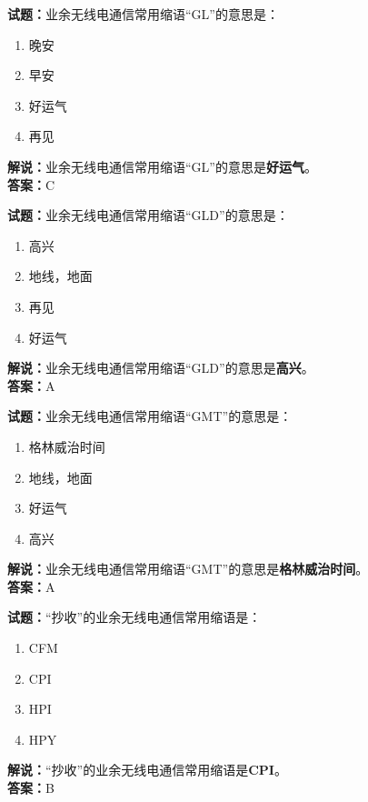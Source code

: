 \documentclass{ctexbook}
\begin{document}
\bigskip


\noindent\textbf{试题：}业余无线电通信常用缩语“GL”的意思是：
\begin{enumerate}[leftmargin=3em]
\item 晚安
\item 早安
\item 好运气
\item 再见
\end{enumerate}
\noindent\textbf{解说：}业余无线电通信常用缩语“GL”的意思是\textbf{好运气}。\\\noindent\textbf{答案：}C



\bigskip


\noindent\textbf{试题：}业余无线电通信常用缩语“GLD”的意思是：
\begin{enumerate}[leftmargin=3em]
\item 高兴
\item 地线，地面
\item 再见
\item 好运气
\end{enumerate}
\noindent\textbf{解说：}业余无线电通信常用缩语“GLD”的意思是\textbf{高兴}。\\\noindent\textbf{答案：}A



\bigskip


\noindent\textbf{试题：}业余无线电通信常用缩语“GMT”的意思是：
\begin{enumerate}[leftmargin=3em]
\item 格林威治时间
\item 地线，地面
\item 好运气
\item 高兴
\end{enumerate}
\noindent\textbf{解说：}业余无线电通信常用缩语“GMT”的意思是\textbf{格林威治时间}。\\\noindent\textbf{答案：}A



\bigskip


\noindent\textbf{试题：}“抄收”的业余无线电通信常用缩语是：
\begin{enumerate}[leftmargin=3em]
\item CFM
\item CPI
\item HPI
\item HPY
\end{enumerate}
\noindent\textbf{解说：}“抄收”的业余无线电通信常用缩语是\textbf{CPI}。\\\noindent\textbf{答案：}B
\end{document}

